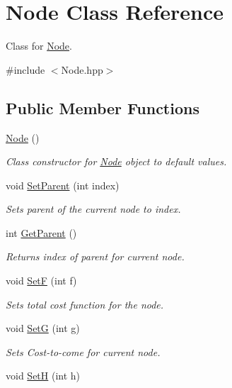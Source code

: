 \hypertarget{classNode}{}\section{Node Class Reference}
\label{classNode}


Class for \hyperlink{classNode}{Node}.  




{\ttfamily \#include $<$Node.\+hpp$>$}

\subsection*{Public Member Functions}
\begin{DoxyCompactItemize}
\item 
\hyperlink{classNode_ad7a34779cad45d997bfd6d3d8043c75f}{Node} ()
\begin{DoxyCompactList}\small\item\em Class constructor for \hyperlink{classNode}{Node} object to default values. \end{DoxyCompactList}\item 
void \hyperlink{classNode_a315c36c92f2c4b33d43bb1c6bb66231c}{Set\+Parent} (int index)
\begin{DoxyCompactList}\small\item\em Sets parent of the current node to index. \end{DoxyCompactList}\item 
int \hyperlink{classNode_a0c88f847679bdc55ef7e69f5fbc63c1f}{Get\+Parent} ()
\begin{DoxyCompactList}\small\item\em Returns index of parent for current node. \end{DoxyCompactList}\item 
void \hyperlink{classNode_a1b9370053e145b1a52ec4b4d1c748d58}{SetF} (int f)
\begin{DoxyCompactList}\small\item\em Sets total cost function for the node. \end{DoxyCompactList}\item 
void \hyperlink{classNode_a257063494fbc264f08f8e0c4e8118db2}{SetG} (int g)
\begin{DoxyCompactList}\small\item\em Sets Cost-\/to-\/come for current node. \end{DoxyCompactList}\item 
void \hyperlink{classNode_ad9ac82445895931622b8df57183a3603}{SetH} (int h)

\end{DoxyCompactItemize}
